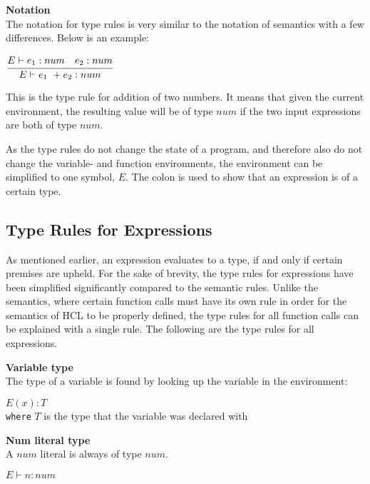 \textbf{Notation}\\
The notation for type rules is very similar to the notation of semantics with a few differences.
Below is an example:\\
\begin{center}
	\begin{math}
	\cfrac
	{E \vdash e_1 : num \quad e_2 : num}
	{E \vdash e_1\ + e_2 : num}
	\end{math}
\end{center}
This is the type rule for addition of two numbers.
It means that given the current environment, the resulting value will be of type $num$ if the two input expressions are both of type $num$.

As the type rules do not change the state of a program, and therefore also do not change the variable- and function environments, the environment can be simplified to one symbol, $E$.
The colon is used to show that an expression is of a certain type.

\subsection{Type Rules for Expressions}
As mentioned earlier, an expression evaluates to a type, if and only if certain premises are upheld.
For the sake of brevity, the type rules for expressions have been simplified significantly compared to the semantic rules.
Unlike the semantics, where certain function calls must have its own rule in order for the semantics of HCL to be properly defined, the type rules for all function calls can be explained with a single rule.
The following are the type rules for all expressions.

\textbf{Variable type}\\
The type of a variable is found by looking up the variable in the environment:\\
\begin{center}
	\begin{math}
	E(x) : T
	\end{math}
	\\[1\baselineskip]
	\texttt{where} $T$ is the type that the variable was declared with
\end{center}


\textbf{Num literal type}\\
A $num$ literal is always of type $num$.

\begin{center}
	\begin{math}
		E \vdash n : num
	\end{math}
\end{center}

